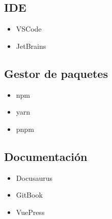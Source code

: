 \subsection{IDE}
\begin{itemize}
    \item VSCode
    \item JetBrains
\end{itemize}

\subsection{Gestor de paquetes}
\begin{itemize}
    \item npm
    \item yarn
    \item pnpm
\end{itemize}

\subsection{Documentación}
\begin{itemize}
    \item Docusaurus
    \item GitBook
    \item VuePress
\end{itemize}


